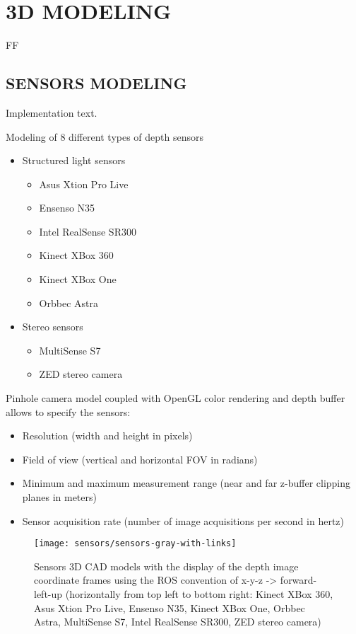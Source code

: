 \section{\uppercase{3D modeling}}\label{sec:modeling}

\noindent FF


\subsection{\uppercase{Sensors modeling}}

Implementation text.

Modeling of 8 different types of depth sensors
\begin{itemize}
	\item Structured light sensors
	\begin{itemize}
		\item Asus Xtion Pro Live
		\item Ensenso N35
		\item Intel RealSense SR300
		\item Kinect XBox 360
		\item Kinect XBox One
		\item Orbbec Astra
	\end{itemize}
	\item Stereo sensors
	\begin{itemize}
		\item MultiSense S7
		\item ZED stereo camera
	\end{itemize}
\end{itemize}
Pinhole camera model coupled with OpenGL color rendering and depth buffer allows to specify the sensors:
\begin{itemize}
	\item Resolution (width and height in pixels)
	\item Field of view (vertical and horizontal FOV in radians)
	\item Minimum and maximum measurement range (near and far z-buffer clipping planes in meters)
	\item Sensor acquisition rate (number of image acquisitions per second in hertz)
\end{itemize}

\begin{figure}
	\centering
	\texttt{[image: sensors/sensors-gray-with-links]}
	\caption{Sensors 3D CAD models with the display of the depth image coordinate frames using the ROS convention of x-y-z -> forward-left-up (horizontally from top left to bottom right: Kinect XBox 360, Asus Xtion Pro Live, Ensenso N35, Kinect XBox One, Orbbec Astra, MultiSense S7, Intel RealSense SR300, ZED stereo camera)}
\end{figure}



